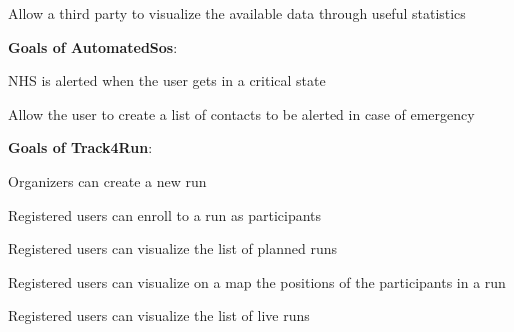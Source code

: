 \begin{goalList}
\begin{enumerate}[label={[}G3.\arabic*{]}]
    \item \label{goal:parties5}Allow a third party to visualize the available data through useful statistics
    \newline
    
\end{enumerate}

\textbf{Goals of AutomatedSos}:
\begin{enumerate}[label={[}G4.\arabic*{]}]

\item \label{goal:sos1}NHS is alerted when the user gets in a critical state
\item \label{goal:sos2}Allow the user to create a list of contacts to be alerted  in case of emergency
    
\end{enumerate}
\newpage

\textbf{Goals of Track4Run}:
\begin{enumerate}[label={[}G5.\arabic*{]}]

    \item \label{goal:run1}Organizers can create a new run
    \item \label{goal:run2}Registered users can enroll to a run as participants
    \item \label{goal:run3}Registered users can visualize the list of planned runs
    \item \label{goal:run4}Registered users can visualize on a map the positions of the participants in a run
    \item\label{goal:run5}Registered users can visualize the list of live runs
    
\end{enumerate}
\end{goalList}
